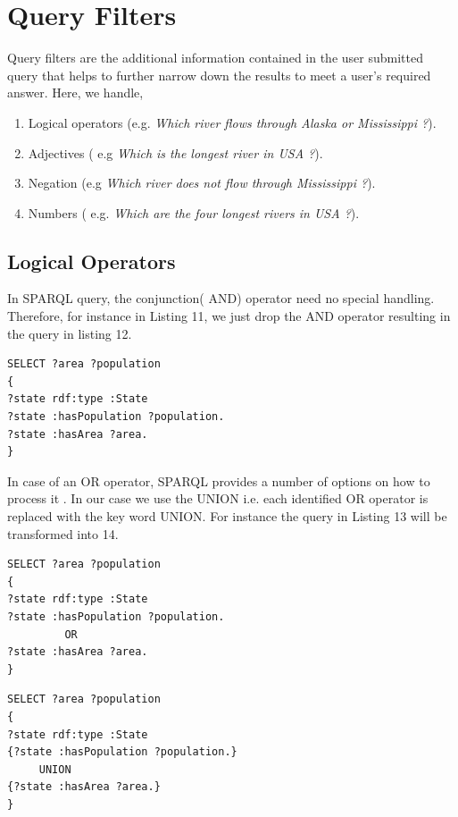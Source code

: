 \documentclass[review]{elsarticle}
\begin{document}
\section{Query Filters}
Query filters are the additional information contained in the user submitted query that helps to further narrow down the results to meet a  user's  required answer. Here, we handle,
\begin{enumerate}
\item Logical operators (e.g. \textit{Which river flows through Alaska or Mississippi ?}).
\item Adjectives ( e.g \textit{ Which is the longest river in USA ?}).
\item Negation (e.g \textit{Which river does not flow through Mississippi ?}).
\item Numbers ( e.g.\textit{ Which are the four longest rivers  in USA ?}).

\end{enumerate}
\subsection{Logical Operators}
In SPARQL query,  the conjunction( AND) operator need no special handling. Therefore, for instance in Listing 11, we just drop the AND operator resulting in the query in listing 12. 
\begin{lstlisting}[caption= SPARQL construction]
SELECT ?area ?population
{
?state rdf:type :State
?state :hasPopulation ?population.
?state :hasArea ?area.
} 
\end{lstlisting}
In case of an OR operator, SPARQL provides a number of options on how to process it  \citep{Sparql12}. In our case we use the UNION i.e.  each identified OR operator is replaced with the key word UNION. For instance the query in Listing 13 will be transformed into 14.
\begin{lstlisting}[caption= SPARQL construction]
SELECT ?area ?population
{
?state rdf:type :State
?state :hasPopulation ?population.
         OR
?state :hasArea ?area.
} 
\end{lstlisting}
\begin{lstlisting}[caption= SPARQL construction]
SELECT ?area ?population
{
?state rdf:type :State
{?state :hasPopulation ?population.}
     UNION
{?state :hasArea ?area.}
} 
\end{lstlisting}
\end{document}
